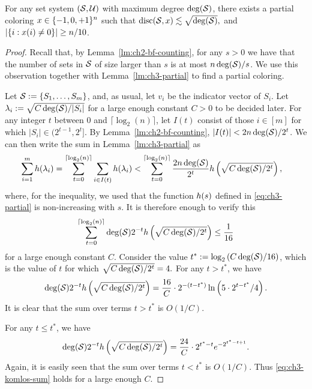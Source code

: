 \begin{lemma}\label{lm:ch3-bf-partial}
  For any set system \((\mathcal{S}, \mathcal{U})\) with maximum degree
  \(\operatorname{deg}(\mathcal{S})\), there
  exists a partial coloring \(x \in \{-1, 0,+1\}^n\) such that 
  \(\operatorname{disc}(\mathcal{S},x) \lesssim \sqrt{\operatorname{deg}(\mathcal{S})}, \) and \(|\{i: x(i) \neq 0\}|
  \ge n/10\).
\end{lemma}
\begin{proof}
  Recall that, by Lemma~\ref{lm:ch2-bf-counting}, for any $s > 0$ we
  have that the number of sets in $\mathcal{S}$ of size larger than $s$ is at
  most $n\operatorname{deg}(\mathcal{S})/s$. We use this observation together with
  Lemma~\ref{lm:ch3-partial} to find a partial coloring.

  Let $\mathcal{S} := \{S_1, \ldots, S_m\}$, and, as usual, let $v_i$ be the indicator vector of $S_i$.  Let
  \(\lambda_i := \sqrt{C\operatorname{deg}(\mathcal{S})/|S_i|}\) for a large enough
  constant \(C > 0\) to be decided later.
  For any integer \(t\) between \(0\) and
  \(\lceil \log_2(n)\rceil\), let \(I(t)\) consist of those
  \(i \in [m]\) for which \(|S_i| \in (2^{t-1},2^{t}]\). By
  Lemma~\ref{lm:ch2-bf-counting}, $|I(t)| < 2n\operatorname{deg}(\mathcal{S})/2^t$. We
  can then write the sum in Lemma~\ref{lm:ch3-partial} as
  \begin{align*}
    \sum_{i = 1}^m h(\lambda_i)
    =
      \sum_{t = 0}^{\lceil \log_2(n)\rceil} \sum_{i \in I(t)} h(\lambda_i)
    &<       \sum_{t = 0}^{\lceil \log_2(n)\rceil}
      \frac{2n\operatorname{deg}(\mathcal{S})}{2^t} h\left(\sqrt{C\operatorname{deg}(\mathcal{S})/2^t}\right),
  \end{align*}
  where, for the  inequality, we used that the function
  \(h(s)\) defined in \eqref{eq:ch3-partial} is non-increasing with $s$.
  It is therefore enough to verify this
  \begin{equation}\label{eq:ch3-komlos-sum}
    \sum_{t = 0}^{\lceil \log_2(n)\rceil}
    \operatorname{deg}(\mathcal{S})2^{-t} h\left(\sqrt{C\operatorname{deg}(\mathcal{S})/2^t}\right) \le \frac{1}{16}
  \end{equation}
  for a large enough constant $C$. Consider the value $t^* :=
  \log_2\left(C\operatorname{deg}(\mathcal{S})/16\right)$, which is the value of $t$ for which
  \(\sqrt{C\operatorname{deg}(\mathcal{S})/2^t} = 4.\)
  For any $t > t^*$,  we have
  \[
    \operatorname{deg}(\mathcal{S})2^{-t} h\left(\sqrt{C\operatorname{deg}(\mathcal{S})/2^{t}}\right)
    = \frac{16}{C}\cdot 2^{-(t-t^*)}\ln\left(5\cdot
          2^{t-t^*}/4\right).
  \]
  It is clear that the sum over terms $t > t^*$ is $O\left(1/C\right)$.

  For
  any $t \le t^*$, we have
  \[
    \operatorname{deg}(\mathcal{S})2^{-t} h\left(\sqrt{C\operatorname{deg}(\mathcal{S})/2^{t}}\right)
    =
    \frac{24}{C}\cdot 2^{t^* - t}e^{-2^{t^*-t+1}}.
  \]
  Again, it is easily seen that the sum over terms  $t <
  t^*$ is $O(1/C)$. Thus \eqref{eq:ch3-komlos-sum} holds for a large enough $C$.
\end{proof}

